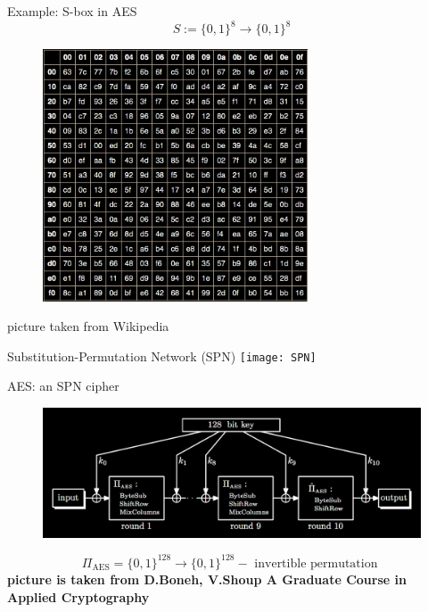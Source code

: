 \documentclass[usenames,dvipsnames, 9pt]{beamer}
\begin{document}
\begin{frame}{Example: S-box in AES}
\Large
\[
S:= \{0,1\}^8 \rightarrow \{0,1\}^8
\]

\begin{figure}
\includegraphics[width=0.7\textwidth]{AES_Sbox}
\end{figure}

\vfill
\small
{\color{gray} {picture taken from Wikipedia}} 

\end{frame}

\begin{frame}{Substitution-Permutation Network (SPN)}
\centering
{}
\texttt{[image: SPN]}

\end{frame}

\begin{frame}{AES: an SPN cipher}
	\begin{figure}
		\includegraphics[width=1.1\textwidth]{AES_128}
	\end{figure}
	
	\Large 
	\[
		\Pi_{\text{AES}}  = \{0,1\}^{128} \rightarrow \{0,1\}^{128} - \text{ invertible permutation }
	\]
	\vfill
	\small
	{\color{gray}\textbf{picture is taken from D.Boneh, V.Shoup A Graduate Course in Applied Cryptography}} 
\end{frame}
\end{document}

